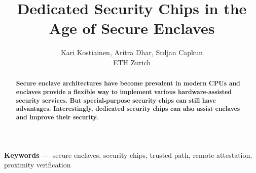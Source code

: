 \documentclass[letterpaper,twocolumn,10pt]{article}
\title{Dedicated Security Chips in the Age of Secure Enclaves}
\author{Kari Kostiainen, Aritra Dhar, Srdjan Capkun \\ ETH Zurich}
\begin{document}
\maketitle
\thispagestyle{empty}

\begin{abstract}
\textbf{Secure enclave architectures have become prevalent in modern CPUs and enclaves provide a flexible way to implement various hardware-assisted security services. But special-purpose security chips can still have advantages. Interestingly, dedicated security chips can also assist enclaves and improve their security.}
\end{abstract}

\vspace{10pt}
\noindent
\textbf{Keywords ---} secure enclaves, security chips, trusted path, remote attestation, proximity verification








 



 
 
\end{document}
